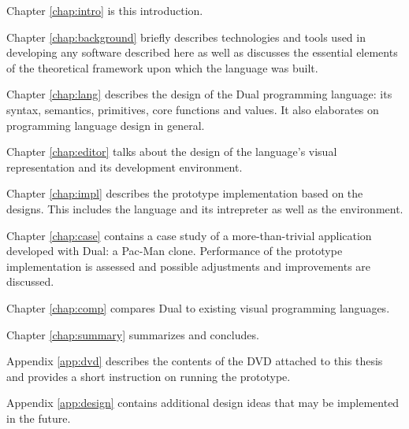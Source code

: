 Chapter \ref{chap:intro} is this introduction.

Chapter \ref{chap:background} briefly describes technologies and tools used in developing any software described here as well as discusses the essential elements of the theoretical framework upon which the language was built.

Chapter \ref{chap:lang} describes the design of the Dual programming language: its syntax, semantics, primitives, core functions and values. It also elaborates on programming language design in general.

Chapter \ref{chap:editor} talks about the design of the language's visual representation and its development environment. 

Chapter \ref{chap:impl} describes the prototype implementation based on the designs. This includes the language and its intrepreter as well as the environment.

Chapter \ref{chap:case} contains a case study of a more-than-trivial application developed with Dual: a Pac-Man clone. Performance of the prototype implementation is assessed and possible adjustments and improvements are discussed.

Chapter \ref{chap:comp} compares Dual to existing visual programming languages.

Chapter \ref{chap:summary} summarizes and concludes.

Appendix \ref{app:dvd} describes the contents of the DVD attached to this thesis and provides a short instruction on running the prototype.

Appendix \ref{app:design} contains additional design ideas that may be implemented in the future.
